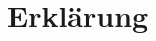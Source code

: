 \documentclass{scrreprt}
\author{Leon Merten Lohse}
\begin{document}
\maketitle

\appendix
\chapter*{Erklärung}
\erklaerung
\end{document}
